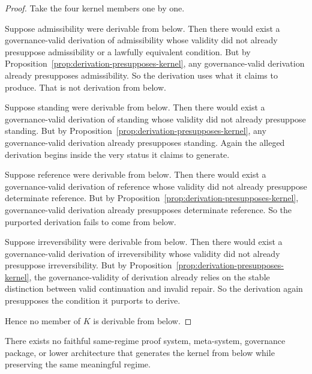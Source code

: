 \begin{proof}
Take the four kernel members one by one.

Suppose admissibility were derivable from below. Then there would exist a governance-valid derivation of admissibility whose validity did not already presuppose admissibility or a lawfully equivalent condition. But by Proposition~\ref{prop:derivation-presupposes-kernel}, any governance-valid derivation already presupposes admissibility. So the derivation uses what it claims to produce. That is not derivation from below.

Suppose standing were derivable from below. Then there would exist a governance-valid derivation of standing whose validity did not already presuppose standing. But by Proposition~\ref{prop:derivation-presupposes-kernel}, any governance-valid derivation already presupposes standing. Again the alleged derivation begins inside the very status it claims to generate.

Suppose reference were derivable from below. Then there would exist a governance-valid derivation of reference whose validity did not already presuppose determinate reference. But by Proposition~\ref{prop:derivation-presupposes-kernel}, governance-valid derivation already presupposes determinate reference. So the purported derivation fails to come from below.

Suppose irreversibility were derivable from below. Then there would exist a governance-valid derivation of irreversibility whose validity did not already presuppose irreversibility. But by Proposition~\ref{prop:derivation-presupposes-kernel}, the governance-validity of derivation already relies on the stable distinction between valid continuation and invalid repair. So the derivation again presupposes the condition it purports to derive.

Hence no member of $K$ is derivable from below.\cite{MaleyFoundationalClosure}
\end{proof}

\begin{corollary}
\label{cor:no-faithful-lower-generator}
There exists no faithful same-regime proof system, meta-system, governance package, or lower architecture that generates the kernel from below while preserving the same meaningful regime.
\end{corollary}


